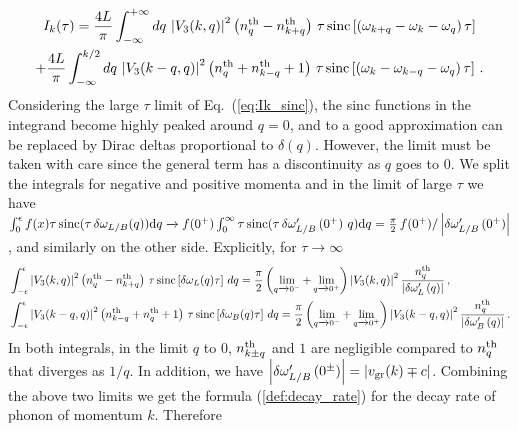 \documentclass[aps,prd,notitlepage,amsfonts,amssymb,amsmath,nofootinbib,superscriptaddress,longbibliography]{revtex4-2}
\begin{document}
\begin{appendices}
\begin{multline}
\label{eq:Ik_sinc}
    I_{k}(\tau)= \frac{4 L}{\pi} \int_{-\infty}^{+\infty} dq \, \left|V_{3}(k,q)\right|^{2} \left( n_{q}^{\rm th} - n_{k+q}^{\rm th} \right) \, \tau \, {\rm sinc}\left[\left(\omega_{k+q}-\omega_{k}-\omega_{q}\right) \tau \right] \\
    + \frac{4 L}{\pi} \int_{-\infty}^{k/2} dq \, \left|V_{3}(k-q,q)\right|^{2} \left(n_{q}^{\rm th} + n_{k-q}^{\rm th} + 1\right) \, \tau \, {\rm sinc}\left[\left(\omega_{k}-\omega_{k-q}-\omega_{q}\right) \tau \right] \,.
\end{multline}
Considering the large $\tau$ limit of Eq.~(\ref{eq:Ik_sinc}), the sinc functions in the integrand become highly peaked around $q=0$, and to a good approximation can be replaced by Dirac deltas proportional to $\delta \left( q \right)$.  However, the limit must be taken with care since the general term has a discontinuity as $q$ goes to $0$. We split the integrals for negative and positive momenta and in the limit of large $\tau$ we have $\int_0^{\epsilon} f(x) \tau \, {\rm sinc}(\tau \, \delta \omega_{L/B} (q))  \mathrm{d}q  \xrightarrow{} f(0^+) \int_0^{\infty} \tau \, {\rm sinc}(\tau \, \delta\omega_{L/B}^{\prime}\left(0^{+}\right) \, q)  \mathrm{d}q = \frac{\pi}{2} \, f(0^+) / \left|\delta\omega_{L/B}^{\prime}\left(0^{+}\right)\right| $, and similarly on the other side.  
Explicitly, for $\tau \to \infty$
\begin{align}
\begin{split}
\label{eq:sinc_to_delta}
& \int_{-\epsilon}^{\epsilon}  \left| V_{3}(k,q) \right|^{2} \left( n^{\rm th}_q - n^{\rm th}_{k+q} \right) \, \tau \, {\rm sinc} \left[ \delta \omega_L (q) \tau \right] \, d q = \frac{\pi}{2} \left( \lim_{q \xrightarrow{} 0^-} + \lim_{q \xrightarrow{} 0^+} \right) \left| V_{3}(k,q) \right|^{2} \frac{n^{\rm th}_q}{ \left| \delta \omega_L^{\prime} \left( q \right) \right| }  \, , \\
& \int_{-\epsilon}^{\epsilon} \left| V_{3}(k-q,q) \right|^{2}  \left(n^{\rm th}_{k-q}+n^{\rm th}_q+1\right)  \, \tau \, {\rm sinc}\left[ \delta \omega_B (q) \tau \right] \, d q  =  \frac{ \pi }{2} \left( \lim_{q \xrightarrow{} 0^-} + \lim_{q \xrightarrow{} 0^+} \right) \left| V_{3}(k-q,q) \right|^{2} \frac{n^{\rm th}_q}{ \left| \delta \omega_B^{\prime} \left( q \right) \right| } \, .
\end{split}
\end{align}
In both integrals, in the limit $q$ to $0$, $n^{\rm th}_{k \pm q}$ and $1$ are negligible compared to $n^{\rm th}_q$ that diverges as $1/q$. In addition, we have $\left|\delta\omega_{L/B}^{\prime}\left(0^{\pm}\right)\right| = \left| v_{\rm gr}(k) \mp c \right|$. Combining the above two limits we get the formula (\ref{def:decay_rate}) for the decay rate of phonon of momentum $k$. Therefore

\end{appendices}
\end{document}

